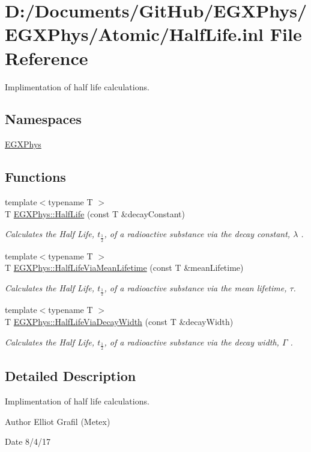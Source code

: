 \hypertarget{_half_life_8inl}{}\section{D\+:/\+Documents/\+Git\+Hub/\+E\+G\+X\+Phys/\+E\+G\+X\+Phys/\+Atomic/\+Half\+Life.inl File Reference}
\label{_half_life_8inl}


Implimentation of half life calculations.  


\subsection*{Namespaces}
\begin{DoxyCompactItemize}
\item 
 \hyperlink{namespace_e_g_x_phys}{E\+G\+X\+Phys}
\end{DoxyCompactItemize}
\subsection*{Functions}
\begin{DoxyCompactItemize}
\item 
{\footnotesize template$<$typename T $>$ }\\T \hyperlink{group___half_life_ga21d268f154fb91c1c556bbfa7fe83ac1}{E\+G\+X\+Phys\+::\+Half\+Life} (const T \&decay\+Constant)
\begin{DoxyCompactList}\small\item\em Calculates the Half Life, $t_{\frac{1}{2}}$, of a radioactive substance via the decay constant, $\lambda$ . \end{DoxyCompactList}\item 
{\footnotesize template$<$typename T $>$ }\\T \hyperlink{group___half_life_gacddef16b62e98b214ec8dd8af7da7dce}{E\+G\+X\+Phys\+::\+Half\+Life\+Via\+Mean\+Lifetime} (const T \&mean\+Lifetime)
\begin{DoxyCompactList}\small\item\em Calculates the Half Life, $t_{\frac{1}{2}}$, of a radioactive substance via the mean lifetime, $\tau$. \end{DoxyCompactList}\item 
{\footnotesize template$<$typename T $>$ }\\T \hyperlink{group___half_life_gaba3fda944d1a68ee1016a1f2f5809359}{E\+G\+X\+Phys\+::\+Half\+Life\+Via\+Decay\+Width} (const T \&decay\+Width)
\begin{DoxyCompactList}\small\item\em Calculates the Half Life, $t_{\frac{1}{2}}$, of a radioactive substance via the decay width, $\Gamma$ . \end{DoxyCompactList}\end{DoxyCompactItemize}


\subsection{Detailed Description}
Implimentation of half life calculations. 

\begin{DoxyAuthor}{Author}
Elliot Grafil (Metex) 
\end{DoxyAuthor}
\begin{DoxyDate}{Date}
8/4/17 
\end{DoxyDate}
